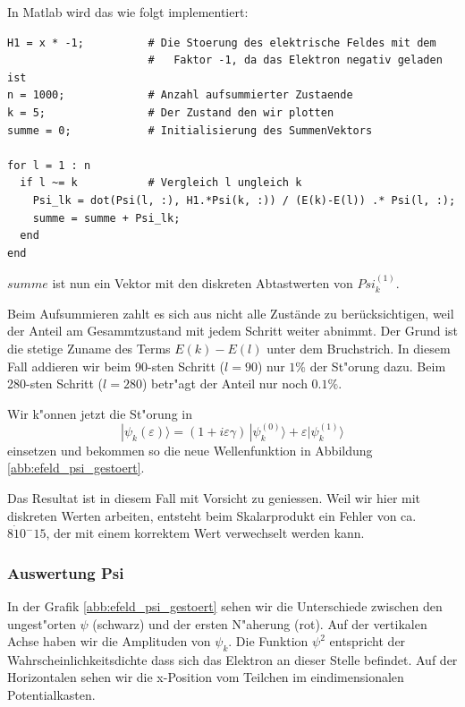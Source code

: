 \begin{refsection}
In Matlab wird das wie folgt implementiert:
\begin{lstlisting}[style=Matlab]
H1 = x * -1;          # Die Stoerung des elektrische Feldes mit dem
                      #   Faktor -1, da das Elektron negativ geladen ist
n = 1000;             # Anzahl aufsummierter Zustaende
k = 5;                # Der Zustand den wir plotten
summe = 0;            # Initialisierung des SummenVektors

for l = 1 : n
  if l ~= k           # Vergleich l ungleich k
    Psi_lk = dot(Psi(l, :), H1.*Psi(k, :)) / (E(k)-E(l)) .* Psi(l, :);
    summe = summe + Psi_lk;
  end
end
\end{lstlisting}
$summe$ ist nun ein Vektor mit den diskreten Abtastwerten von $Psi_k^{(1)}$.

Beim Aufsummieren zahlt es sich aus nicht alle Zust\"ande zu ber\"ucksichtigen, weil der Anteil am Gesammtzustand 
mit jedem Schritt weiter abnimmt. Der Grund ist die stetige Zuname des Terms $E(k)-E(l)$ unter dem Bruchstrich.
In diesem Fall addieren wir beim 90-sten Schritt ($l=90$) nur $1\%$ der St"orung dazu.
Beim 280-sten Schritt ($l=280$) betr"agt der Anteil nur noch $0.1\%$.

Wir k"onnen jetzt die St"orung in 
\begin{equation}
|\psi_k(\varepsilon)\rangle
=
(1+i\varepsilon \gamma)
\,|\psi_k^{(0)}\rangle
+
\varepsilon|\psi_k^{(1)}\rangle
\end{equation}
einsetzen und bekommen so die neue Wellenfunktion in Abbildung \ref{abb:efeld_psi_gestoert}.

Das Resultat ist in diesem Fall mit Vorsicht zu geniessen.
Weil wir hier mit diskreten Werten arbeiten, entsteht beim Skalarprodukt ein Fehler von ca. $8\dot 10^-15$,
der mit einem korrektem Wert verwechselt werden kann.




\subsubsection{Auswertung Psi}

In der Grafik \ref{abb:efeld_psi_gestoert} sehen wir die Unterschiede zwischen den ungest"orten $\psi$ (schwarz) und der ersten N"aherung (rot).
Auf der vertikalen Achse haben wir die Amplituden von $\psi_k$.
Die Funktion $\psi^2$ entspricht der Wahrscheinlichkeitsdichte dass sich das Elektron an dieser Stelle befindet.
Auf der Horizontalen sehen wir die x-Position vom Teilchen im eindimensionalen Potentialkasten.


\end{refsection}
